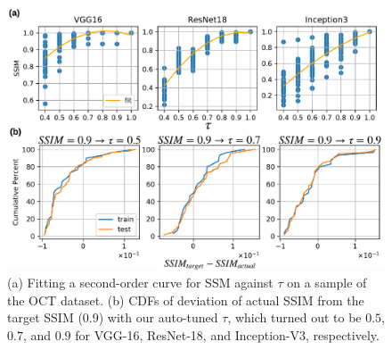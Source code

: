 \begin{figure}[t]
\includegraphics[width=\columnwidth]{images/system_tuning}
\vspace{-8mm}
\caption{(a) Fitting a second-order curve for SSM against $\tau$ on a sample of the OCT dataset. 
(b) CDFs of deviation of actual SSIM from the target SSIM ($0.9$) with our auto-tuned $\tau$, which turned out to be $0.5$, $0.7$, and $0.9$ for VGG-16, ResNet-18, and Inception-V3, respectively.}
\label{fig:system_tuning}
\end{figure}


